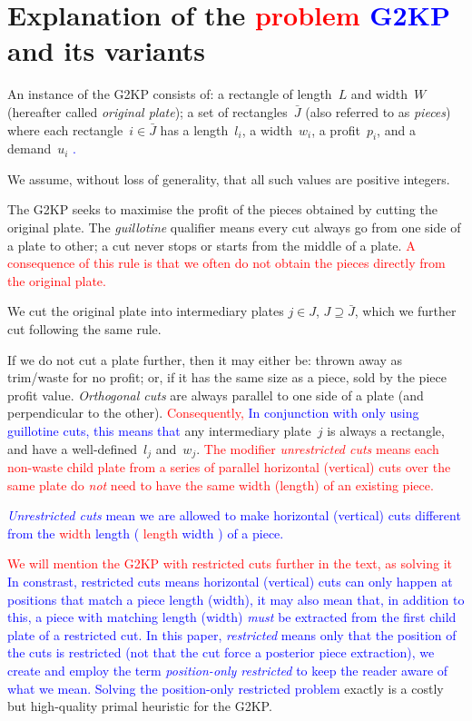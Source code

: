 \documentclass[ppgc,tese,english,formais,babel]{iiufrgs}
\newif\iffinalversion
\newcommand{\newtext}[1]{\iffinalversion%
#1%
\else%
\textcolor{blue}{#1}%
\fi%
}
\newcommand{\oldtext}[1]{\iffinalversion%
\else%
\textcolor{red}{#1}%
\fi%
}
\begin{document}
\section{Explanation of the \oldtext{problem}\newtext{G2KP} and its variants}

An instance of the G2KP consists of: a rectangle of length~\(L\) and width~\(W\) (hereafter called \emph{original plate}); a set of rectangles~\(\bar{J}\) (also referred to as \emph{pieces}) where each rectangle~\(i \in \bar{J}\) has a length~\(l_i\), a width~\(w_i\), a profit~\(p_i\), and a demand~\(u_i\)\newtext{.}
We assume, without loss of generality, that all such values are positive integers.

The G2KP seeks to maximise the profit of the pieces obtained by cutting the original plate.
The \emph{guillotine} qualifier means every cut always go from one side of a plate to other; a cut never stops or starts from the middle of a plate.
\oldtext{A consequence of this rule is that we often do not obtain the pieces directly from the original plate.}
We cut the original plate into intermediary plates \(j \in J\), \(J \supseteq \bar{J}\), which we further cut following the same rule.

If we do not cut a plate further, then it may either be: thrown away as trim/waste for no profit; or, if it has the same size as a piece, sold by the piece profit value.
\emph{Orthogonal cuts} are always parallel to one side of a plate (and perpendicular to the other).
\oldtext{Consequently,}\newtext{In conjunction with only using guillotine cuts, this means that} any intermediary plate~\(j\) is always a rectangle, and have a well-defined~\(l_j\) and~\(w_j\).
\oldtext{The modifier \emph{unrestricted cuts} means each non-waste child plate from a series of parallel horizontal (vertical) cuts over the same plate do \emph{not} need to have the same width (length) of an existing piece.}
\newtext{\emph{Unrestricted cuts} mean we are allowed to make horizontal (vertical) cuts different from the \oldtext{width}\newtext{length} (\oldtext{length}\newtext{width}) of a piece.}
\oldtext{We will mention the G2KP with restricted cuts further in the text, as solving it}\newtext{In constrast, restricted cuts means horizontal (vertical) cuts can only happen at positions that match a piece length (width), it may also mean that, in addition to this, a piece with matching length (width) \emph{must} be extracted from the first child plate of a restricted cut. In this paper, \emph{restricted} means only that the position of the cuts is restricted (not that the cut force a posterior piece extraction), we create and employ the term \emph{position-only restricted} to keep the reader aware of what we mean. Solving the position-only restricted problem} exactly is a costly but high-quality primal heuristic for the G2KP.
\end{document}
